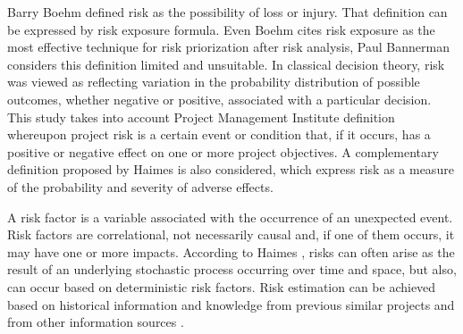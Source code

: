Barry Boehm \cite{BOEHM1991} defined risk as the possibility of loss or injury. That definition can be expressed by risk exposure formula. Even Boehm cites risk exposure as the most effective technique for risk priorization after risk analysis, Paul Bannerman \cite{bannerman2008risk} considers this definition limited and unsuitable. In classical decision theory, risk was viewed as reflecting variation in the probability distribution of possible outcomes, whether negative or positive, associated with a particular decision. This study takes into account Project Management Institute \cite{PMBOK2008} definition whereupon project risk is a certain event or condition that, if it occurs, has a positive or negative effect on one or more project objectives. A complementary definition proposed by Haimes \cite{haimes2011risk} is also considered, which express risk as a measure of the probability and severity of adverse effects.

A risk factor is a variable associated with the occurrence of an unexpected event. Risk factors are correlational, not necessarily causal and, if one of them occurs, it may have one or more impacts. According to Haimes \cite{haimes2011risk}, risks can often arise as the result of an underlying stochastic process occurring over time and space, but also, can occur based on deterministic risk factors. Risk estimation can be achieved based on historical information and knowledge from previous similar projects and from other information sources \cite{PMBOK2008}. 

